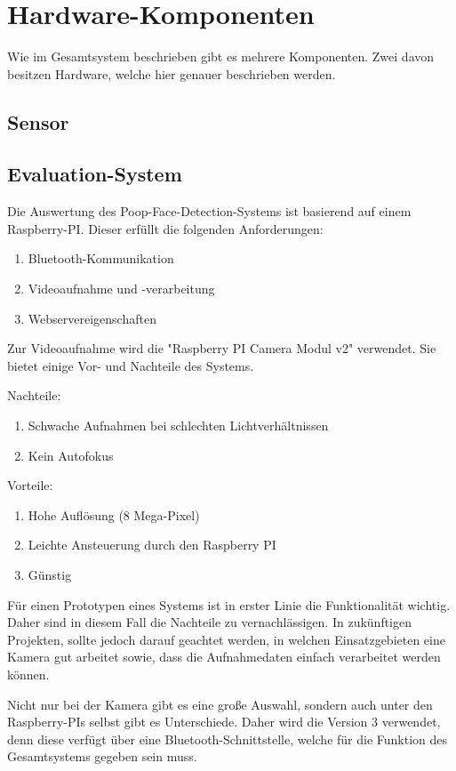 \section{Hardware-Komponenten}
\label{sec:hardware}

Wie im Gesamtsystem beschrieben gibt es mehrere Komponenten. Zwei davon besitzen Hardware, welche hier genauer beschrieben werden.

\subsection{Sensor}

\subsection{Evaluation-System}

Die Auswertung des Poop-Face-Detection-Systems ist basierend auf einem Raspberry-PI. Dieser erfüllt die folgenden Anforderungen:

\begin{enumerate}
\item Bluetooth-Kommunikation
\item Videoaufnahme und -verarbeitung
\item Webservereigenschaften
\end{enumerate}

Zur Videoaufnahme wird die "Raspberry PI Camera Modul v2" verwendet. Sie bietet einige Vor- und Nachteile des Systems.

Nachteile:
\begin{enumerate}
\item Schwache Aufnahmen bei schlechten Lichtverhältnissen
\item Kein Autofokus
\end{enumerate}

Vorteile:
\begin{enumerate}
\item Hohe Auflösung (8 Mega-Pixel)
\item Leichte Ansteuerung durch den Raspberry PI
\item Günstig
\end{enumerate}

Für einen Prototypen eines Systems ist in erster Linie die Funktionalität wichtig. Daher sind in diesem Fall die Nachteile zu vernachlässigen. In zukünftigen Projekten, sollte jedoch darauf geachtet werden, in welchen Einsatzgebieten eine Kamera gut arbeitet sowie, dass die Aufnahmedaten einfach verarbeitet werden können.

Nicht nur bei der Kamera gibt es eine große Auswahl, sondern auch unter den Raspberry-PIs selbst gibt es Unterschiede. Daher wird die Version 3 verwendet, denn diese verfügt über eine Bluetooth-Schnittstelle, welche für die Funktion des Gesamtsystems gegeben sein muss. 
